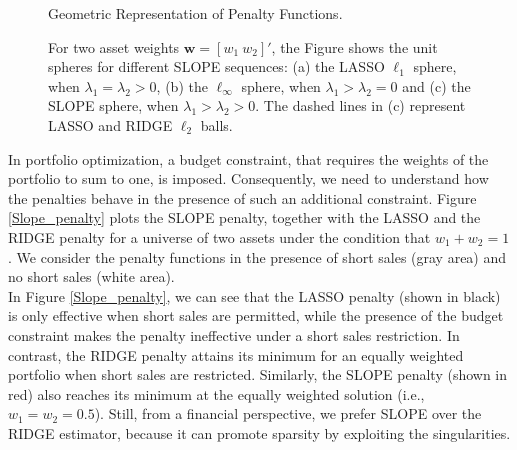 \documentclass[12pt, a4paper]{article}
\newcommand{\bfw}{\boldsymbol{w} }
\begin{document}
\begin{figure} [h!]
\caption{Geometric Representation of Penalty Functions.}\label{Slope_NoBudget}
 \captionsetup{font=scriptsize,labelfont=scriptsize, width=\textwidth}
     \caption*{For two asset weights $\bfw = [w_{1}\ w_{2}]'$, the Figure shows the unit spheres for different SLOPE sequences: (a) the LASSO $\ell_1$ sphere, when $\lambda_{1} = \lambda_{2} > 0$, (b) the $\ell_{\infty}$ sphere, when $\lambda_{1} > \lambda_{2} = 0$ and (c) the SLOPE sphere, when $\lambda_{1} > \lambda_{2} > 0$. The dashed lines in (c) represent LASSO and RIDGE $\ell_2$ balls.}
\end{figure}

\noindent
In portfolio optimization, a budget constraint, that requires the weights of the portfolio to sum to one, is imposed. Consequently, we need to understand how the penalties behave in the presence of such an additional constraint. Figure \ref{Slope_penalty} plots the SLOPE penalty, together with the LASSO and the RIDGE penalty for a universe of two assets under the condition that $w_{1} + w_{2} = 1$. We consider the penalty functions in the presence of short sales (gray area) and no short sales (white area).\\
In Figure \ref{Slope_penalty}, we can see that the LASSO penalty (shown in black) is only effective when short sales are permitted, while the presence of the budget constraint makes the penalty ineffective under a short sales restriction.
In contrast, the RIDGE penalty attains its minimum for an equally weighted portfolio when short sales are restricted. Similarly, the SLOPE penalty (shown in red) also reaches its minimum at the equally weighted solution (i.e., $w_{1} = w_{2} = 0.5$). Still, from a financial perspective, we prefer SLOPE over the RIDGE estimator, because it can promote sparsity by exploiting the singularities.
\end{document}
